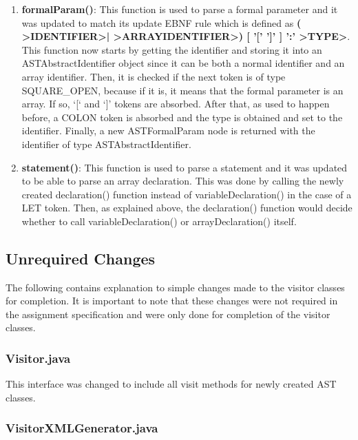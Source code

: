 \documentclass{article}
\begin{document}
\begin{enumerate}
				\item \textbf{formalParam()}: This function is used to parse a formal parameter and it was updated to match its update EBNF rule which is defined as \textbf{( \textgreater IDENTIFIER\textgreater | \textgreater ARRAYIDENTIFIER\textgreater )  [ '[' ']' ] ':' \textgreater TYPE\textgreater}. This function now starts by getting the identifier and storing it into an ASTAbstractIdentifier object since it can be both a normal identifier and an array identifier. Then, it is checked if the next token is of type SQUARE\_OPEN, because if it is, it means that the formal parameter is an array. If so, `[` and `]' tokens are 
							absorbed. After that, as used to happen before, a COLON token is absorbed and the type is obtained and set to the identifier. Finally, a new ASTFormalParam node is returned with the identifier of type ASTAbstractIdentifier.
							
		
					\item \textbf{statement()}: This function is used to parse a statement and it was updated to be able to parse an array declaration. This was done by calling the newly created declaration() function instead of variableDeclaration() in the case of a LET token. Then, as explained above, the declaration() function would decide whether to call variableDeclaration() or arrayDeclaration() itself.
				
			
				\end{enumerate}
				
				
				\subsection{Unrequired Changes}
				
				The following contains explanation to simple changes made to the visitor classes for completion. It is important to note that these changes were not required in the assignment specification and were only done for completion of the visitor classes.
				
				\subsubsection{Visitor.java}
				
				This interface was changed to include all visit methods for newly created AST classes.
				
				\subsubsection{VisitorXMLGenerator.java}
				
\end{document}
